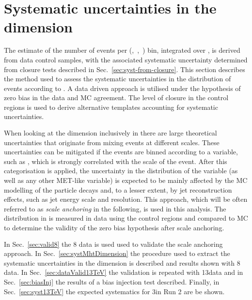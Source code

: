 \section{Systematic uncertainties in the \mht dimension}
\label{sec:syst-on-shape}

The estimate of the number of events per (\njet,~\nb,~\scalht) bin,
integrated over \mht, is derived from data control samples, with
the associated systematic uncertainty determined from closure tests
described in Sec.~\ref{sec:syst-from-closure}. This section
describes the method used to assess the systematic uncertainties in
the distribution of events according to \mht. A data driven approach is
utilised under the hypothesis of zero bias in the data and MC agreement.
The level of closure in the control regions is used
to derive alternative templates accounting for systematic uncertainties.

When looking at the \mht dimension inclusively in \scalht there are
large theoretical uncertainties that originate from mixing events
at different scales. These uncertainties can be mitigated if the events 
are binned according to a variable, such as \scalht, 
which is strongly correlated with the scale of the event. 
After this categorisation is applied, the uncertainty in 
the distribution of the \mht variable
(as well as any other MET-like variable) is expected to be 
mainly affected by the MC modelling of the particle 
decays and, to a lesser extent, by jet reconstruction effects, 
such as jet energy scale and resolution. 
This approach, which will be often referred to as \textit{scale anchoring}
in the following, is used in this analysis. The distribution in \mht
is measured in data using the control regions and compared to MC
to determine the validity of the zero bias hypothesis after scale anchoring.

In Sec.~\ref{sec:valid8} the 8 \TeV data is used used 
to validate the scale anchoring approach. 
In Sec.~\ref{sec:systMhtDimension} 
the procedure used to extract the systematic uncertainties in the 
\mht dimension is described and results shown with 8 \TeV data. 
In Sec.~\ref{sec:dataValid13TeV} the validation is repeated with 13\TeV data
and in Sec.~\ref{sec:biasInj} the results of a bias injection test described.
Finally, in Sec.~\ref{sec:syst13TeV} the expected systematics for 3\ifb in Run 2 are be shown. 



